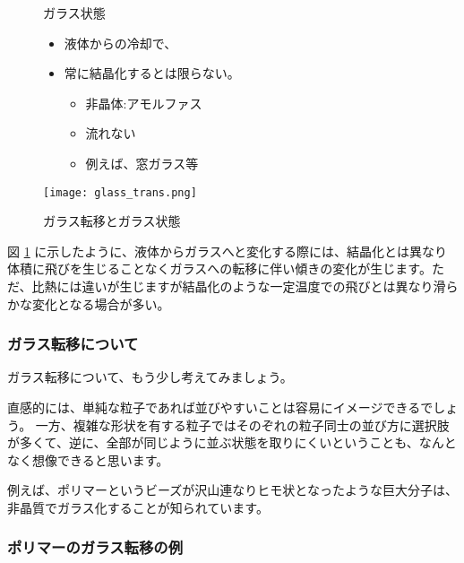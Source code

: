 \documentclass[uplatex,dvipdfmx,a4paper,11pt]{jsarticle}
\begin{document}
\begin{figure}[htb]
	\begin{center}
		\begin{minipage}{0.45\textwidth}
			\large
			\begin{itembox}[l]{ガラス状態}
				\begin{itemize}
					\item 液体からの冷却で、
					\item 常に結晶化するとは限らない。
					\begin{itemize}
						\item 非晶体:アモルファス
						\item 流れない
						\item 例えば、窓ガラス等
					\end{itemize}
				\end{itemize}
			\end{itembox}
		\end{minipage}
		\begin{minipage}{0.45\textwidth}
			\begin{center}
			\texttt{[image: glass\_trans.png]}
			\end{center}
		\end{minipage}
		\caption{ガラス転移とガラス状態}
		\label{fig:glass}
	\end{center}
\end{figure}

図 \ref{fig:glass} に示したように、液体からガラスへと変化する際には、結晶化とは異なり体積に飛びを生じることなくガラスへの転移に伴い傾きの変化が生じます。ただ、比熱には違いが生じますが結晶化のような一定温度での飛びとは異なり滑らかな変化となる場合が多い。 

\subsubsection{ガラス転移について}

ガラス転移について、もう少し考えてみましょう。

直感的には、単純な粒子であれば並びやすいことは容易にイメージできるでしょう。
一方、複雑な形状を有する粒子ではそのぞれの粒子同士の並び方に選択肢が多くて、逆に、全部が同じように並ぶ状態を取りにくいということも、なんとなく想像できると思います。

例えば、ポリマーというビーズが沢山連なりヒモ状となったような巨大分子は、非晶質でガラス化することが知られています。

\subsubsection{ポリマーのガラス転移の例}
\end{document}
